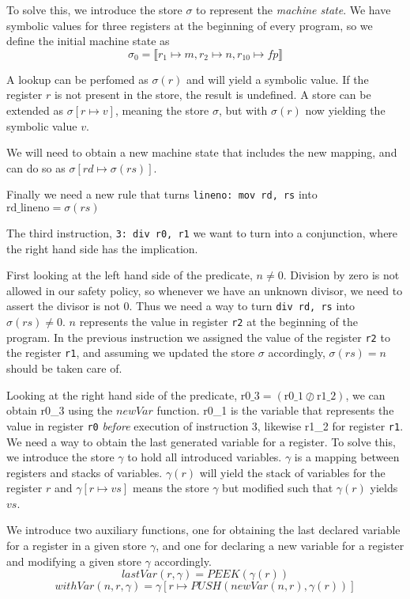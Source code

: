 To solve this, we introduce the store $\sigma$ to represent the \textit{machine state}. We have symbolic values for three registers at the beginning of every program, so we define the initial machine state as \[\sigma_0 = \llbracket r_1 \mapsto m, r_2 \mapsto n, r_{10} \mapsto fp \rrbracket \]

A lookup can be perfomed as $\sigma(r)$ and will yield a symbolic value. If the register $r$ is not present in the store, the result is undefined. 
A store can be extended as $\sigma[r \mapsto v]$, meaning the store $\sigma$, but with $\sigma(r)$ now yielding the symbolic value $v$.

We will need to obtain a new machine state that includes the new mapping, and can do so as $\sigma[rd \mapsto \sigma(rs)]$.

Finally we need a new rule that turns \texttt{lineno: mov rd, rs} into $\text{rd\_lineno} = \sigma(rs)$


The third instruction,  \texttt{3: div r0, r1} we want to turn into a conjunction, where the right hand side has the implication.


First looking at the left hand side of the predicate, $n \neq 0$.
Division by zero is not allowed in our safety policy, so whenever we have an unknown divisor, we need to assert the divisor is not 0. Thus we need a way to turn \texttt{div rd, rs} into $\sigma(rs) \neq 0$.
$n$ represents the value in register \texttt{r2} at the beginning of the program. In the previous instruction we assigned the value of the register \texttt{r2} to the register \texttt{r1}, and assuming we updated the store $\sigma$ accordingly, $\sigma(rs) = n$ should be taken care of. 


Looking at the right hand side of the predicate, $\text{r0\_3} = (\text{r0\_1} \oslash \text{r1\_2})$, we can obtain r0\_3 using the $newVar$ function. r0\_1 is the variable that represents the value in register \texttt{r0} \textit{before} execution of instruction 3, likewise r1\_2 for register \texttt{r1}. We need a way to obtain the last generated variable for a register.
To solve this, we introduce the store $\gamma$ to hold all introduced variables. $\gamma$ is a mapping between registers and stacks of variables.
$\gamma(r)$ will yield the stack of variables for the register $r$ and $\gamma[r \mapsto vs]$ means the store $\gamma$ but modified such that $\gamma(r)$ yields $vs$.

We introduce two auxiliary functions, one for obtaining the last declared variable for a register in a given store $\gamma$, and one for declaring a new variable for a register and modifying a given store $\gamma$ accordingly.
\[
  lastVar(r, \gamma) = PEEK (\gamma(r))
\]
\[
  withVar(n, r, \gamma) = \gamma[r \mapsto PUSH(newVar(n, r), \gamma(r))]
\]


